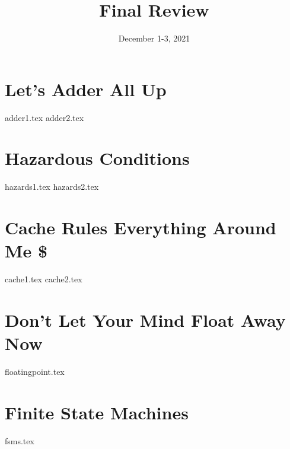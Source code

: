 \documentclass[11pt]{exam}
\title{Final Review}
\date{December 1-3, 2021}
\begin{document}
\maketitle

\section{Let’s Adder All Up}
\begin{questions}
{adder1.tex}
{adder2.tex}
\end{questions}
\newpage

\section{Hazardous Conditions}
\begin{questions}
{hazards1.tex}
{hazards2.tex}
\end{questions}
\newpage

\section{Cache Rules Everything Around Me \$}
\begin{questions}
{cache1.tex}
{cache2.tex}
\end{questions}
\newpage

\section{Don’t Let Your Mind Float Away Now}
\begin{questions}
{floatingpoint.tex}
\end{questions}
\newpage

\section{Finite State Machines}
\begin{questions}
{fsms.tex}
\end{questions}
\newpage
\end{document}
